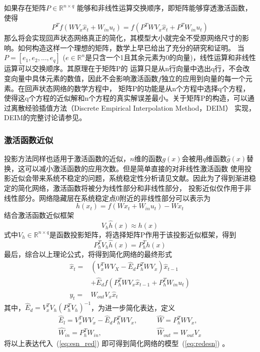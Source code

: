 如果存在矩阵\(P \in \mathbb{R}^{n \times q}\) 能够和非线性运算交换顺序，即矩阵能够穿透激活函数，使得
\begin{equation}
	P^T f(W V_x  \widehat{x}_t + W_{in} u_t) = f(P^T W V_x \widehat{x}_t + P^T W_{in} u_t)	
\end{equation}
那么将会实现回声状态网络真正的简化，其模型大小就完全不受原网络尺寸的影响。如何构造这样一个理想的矩阵，数学上早已给出了充分的研究和证明。
当\(P = [e_1,e_2,...,e_q]\) (\(e \in \mathbb{R}^n\)是只含一个1且其余元素为0的向量)，线性运算和非线性运算可以交换顺序。其原理在于矩阵P的
运算只是从n行向量中选出q行，不会改变向量中具体元素的数值，因此不会影响激活函数\(f\)独立的应用到向量的每一个元素。在回声状态网络的数学方程中，
矩阵P的功能是从n个方程中选择q个方程，使得这q个方程的近似解和n个方程的真实解误差最小。关于矩阵P的构造，可以通过离散经验插值方法（Discrete Empirical Interpolation Method，DEIM）
实现，DEIM的完整讨论请参见\cite{DEIM}。

\subsubsection{激活函数近似}
投影方法同样也适用于激活函数的近似，\(n\)维的函数\(g(x)\)会被用\(q\)维函数\(\widehat{g}(x)\)替换，这可以减小激活函数的应用次数。但是简单直接的对非线性激活函数
使用投影近似会带来系统不稳定的问题，系统稳定性分析请见文献\cite{WangLong:TNNLS'23}。因此为了得到渐进稳定的简化网络，激活函数将被分为线性部分和非线性部分，
投影近似仅作用于非线性部分。网络隐藏层在系统稳定点0附近的非线性部分可以表示为
\begin{equation}\label{eq:h(x)}
	h(x_t) = f(W x_t + W_{in} u_t) - W x_t
\end{equation}
结合激活函数近似框架
\begin{equation}
	V_h \widehat{h}(x) \approx h(x)
\end{equation}
式中\(V_h \in \mathbb{R}^{n \times q}\)是函数投影矩阵，将选择矩阵P作用于该投影近似框架，得到
\begin{equation}\label{eq:Pselect}
	P_h^T V_h \widehat{h}(x) = P_h^T h(x)
\end{equation}
最后，综合以上理论公式，将得到简化网络的最终形式
\begin{equation}\label{eq:esn_red}
	\begin{split}
		\widehat{x}_t  = &(V_x^T W V_X - \widehat{E}_d P_h^T W V_x)\widehat{x}_{t-1}  \\
					     & + \widehat{E}_{d} f(P_h^T W V_x \widehat{x}_{t-1} + P_h^{T} W_{in} u_{t})	\\
				y_t    = &W_{out} V_x \widehat{x}_t
	\end{split}
\end{equation}
其中，\(\widehat{E}_d = V_x^T V_h (P_h^TV_h)^{-1}\)，为进一步简化表达，定义
\begin{equation}
	\begin{split}
		\widehat{E}_l = V_x^T W V_x - \widehat{E}_d P_h^T W V_x,	\qquad &\widehat{W} = P_h^T W V_x,		\\
		\widehat{W}_{in} = P_h^T W_{in},							\qquad &\widehat{W}_{out} = W_{out}V_x
	\end{split}
\end{equation}
将以上表达代入~(\ref{eq:esn_red}) 即可得到简化网络的模型~(\ref{eq:redesn}) 。

